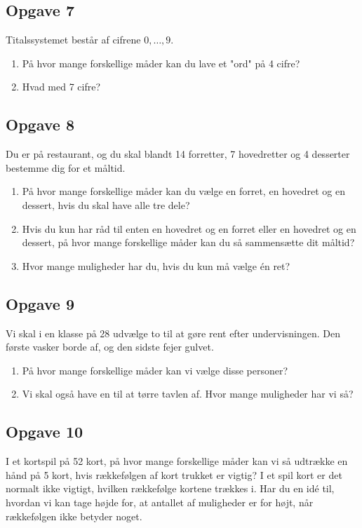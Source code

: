 \subsection*{Opgave 7}
Titalssystemet består af cifrene $0,\hdots,9$. 
\begin{enumerate}[label=\roman*)]
	\item På hvor mange forskellige måder kan du lave et "ord" på 4 cifre?
	\item Hvad med 7 cifre?
\end{enumerate}

\subsection*{Opgave 8}
Du er på restaurant, og du skal blandt 14 forretter, 7 hovedretter og 4 desserter bestemme dig for et måltid. 
\begin{enumerate}[label=\roman*)]
\item På hvor mange forskellige måder kan du vælge en forret, en hovedret og en dessert, hvis du skal have alle tre dele?
\item Hvis du kun har råd til enten en hovedret og en forret eller en hovedret og en dessert, på hvor mange forskellige måder kan du så sammensætte dit måltid?
\item Hvor mange muligheder har du, hvis du kun må vælge én ret?
\end{enumerate}


\subsection*{Opgave 9}
Vi skal i en klasse på 28 udvælge to til at gøre rent efter undervisningen. Den første vasker borde af, og den sidste fejer gulvet. 
\begin{enumerate}[label=\roman*)]

\item På hvor mange forskellige måder kan vi vælge disse personer?
\item Vi skal også have en til at tørre tavlen af. Hvor mange muligheder har vi så?

\end{enumerate}
\subsection*{Opgave 10}
I et kortspil på 52 kort, på hvor mange forskellige måder kan vi så udtrække en hånd på 5 kort, hvis rækkefølgen af kort trukket er vigtig? I et spil kort er det normalt ikke vigtigt, hvilken rækkefølge kortene trækkes i. Har du en idé til, hvordan vi kan tage højde for, at antallet af muligheder er for højt, når rækkefølgen ikke betyder noget. 
